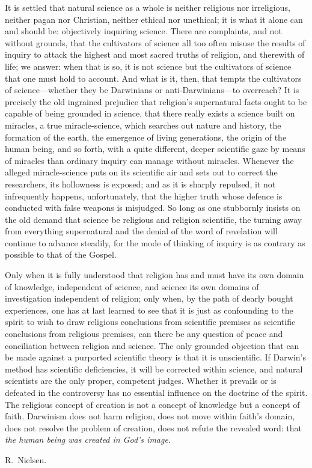 \documentclass[12pt,a4paper]{article}
\begin{document}
It is settled that natural science as a whole is neither religious nor
irreligious, neither pagan nor Christian, neither ethical nor
unethical; it is what it alone can and should be: objectively
inquiring science.
There are complaints, and not without grounds, that the cultivators of
science all too often misuse the results of inquiry to attack the
highest and most sacred truths of religion, and therewith of life; we
answer: when that is so, it is not science but the cultivators of
science that one must hold to account.
And what is it, then, that tempts the cultivators of science---whether
they be Darwinians or anti-Darwinians---to overreach? It is precisely
the old ingrained prejudice that religion's supernatural facts ought
to be capable of being grounded in science, that there really exists a
science built on miracles, a true miracle-science, which searches out
nature and history, the formation of the earth, the emergence of
living generations, the origin of the human being, and so forth, with
a quite different, deeper scientific gaze by means of miracles than
ordinary inquiry can manage without miracles. Whenever the alleged
miracle-science puts on its scientific air and sets out to correct the
researchers, its hollowness is exposed; and as it is sharply repulsed,
it not infrequently happens, unfortunately, that the higher truth
whose defence is conducted with false weapons is misjudged. So long
as one stubbornly insists on the old demand that science be religious
and religion scientific, the turning away from everything supernatural
and the denial of the word of revelation will continue to advance
steadily, for the mode of thinking of inquiry is as contrary as
possible to that of the Gospel.

Only when it is fully understood that religion has and must have its
own domain of knowledge, independent of science, and science its own
domains of investigation
independent of religion; only when, by the path of dearly bought
experiences, one has at last learned to see that it is just as
confounding to the spirit to wish to draw religious conclusions from
scientific premises as scientific conclusions from religious premises,
can there be any question of peace and conciliation between religion
and science. The only grounded objection that can be made against a
purported scientific theory is that it is unscientific. If Darwin's
method has scientific deficiencies, it will be corrected within
science, and natural scientists are the only proper, competent judges.
Whether it prevails or is defeated in the controversy has no essential
influence on the doctrine of the spirit.
The religious concept of creation is not a concept of knowledge but a
concept of faith. Darwinism does not harm religion, does not move
within faith's domain, does not resolve the problem of creation, does
not refute the revealed word: that \emph{the human being was created in
God's image}.

\medskip
\begin{flushright}
R.\ Nielsen.
\end{flushright}
\end{document}
